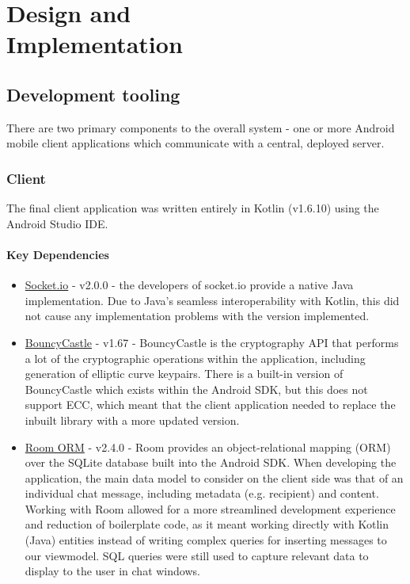 \documentclass{mproj}
\begin{document}
\chapter{Design and \\ Implementation}\label{design}

\section{Development tooling}
There are two primary components to the overall system - one or more Android mobile client applications which communicate with a central, deployed server.

\subsection{Client}
The final client application was written entirely in Kotlin (v1.6.10) using the Android Studio IDE.

\subsubsection{Key Dependencies}
\begin{itemize}
	\item \href{https://github.com/socketio/socket.io-client-java}{Socket.io} - v2.0.0 - the developers of socket.io provide a native Java implementation. Due to Java's seamless interoperability with Kotlin, this did not cause any implementation problems with the version implemented.
	\item \href{https://www.bouncycastle.org/}{BouncyCastle} - v1.67 - BouncyCastle is the cryptography API that performs a lot of the cryptographic operations within the application, including generation of elliptic curve keypairs. There is a built-in version of BouncyCastle which exists within the Android SDK, but this does not support ECC, which meant that the client application needed to replace the inbuilt library with a more updated version.
	\item \href{https://github.com/furnivall/SEng_Final_Project}{Room ORM} - v2.4.0 - Room provides an object-relational mapping (ORM) over the SQLite database built into the Android SDK. When developing the application, the main data model to consider on the client side was that of an individual chat message, including metadata (e.g. recipient) and content. Working with Room allowed for a more streamlined development experience and reduction of boilerplate code, as it meant working directly with Kotlin (Java) entities instead of writing complex queries for inserting messages to our viewmodel. SQL queries were still used to capture relevant data to display to the user in chat windows. 

\end{itemize}
\end{document}
